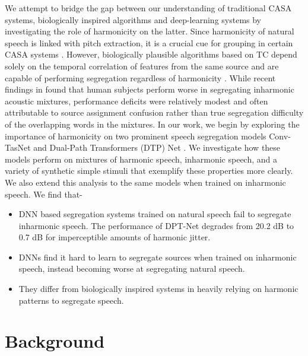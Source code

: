 \documentclass{article}
\begin{document}
We attempt to bridge the gap between our understanding of traditional CASA systems, biologically inspired algorithms and deep-learning systems by investigating the role of harmonicity on the latter. Since harmonicity of natural speech is linked with pitch extraction, it is a crucial cue for grouping in certain CASA systems \cite{vishnubhotla2009algorithm, wang1999separation}. However, biologically plausible algorithms based on TC depend solely on the temporal correlation of features from the same source and are capable of performing segregation regardless of harmonicity \cite{krishnan2014segregating}. While recent findings in \cite{popham2018inharmonic} found that human subjects perform worse in segregating inharmonic acoustic mixtures, performance deficits were relatively modest and often attributable to source assignment confusion rather than true segregation difficulty of the overlapping words in the mixtures. 
In our work, we begin by exploring the importance of harmonicity on two prominent speech segregation models Conv-TasNet \cite{luo2019conv} and Dual-Path Transformers (DTP) Net \cite{chen2020dual}. We investigate how these models perform on mixtures of harmonic speech, inharmonic speech, and a variety of synthetic simple stimuli that exemplify these properties more clearly. We also extend this analysis to the same models when trained on inharmonic speech. We find that- 
\begin{itemize}
    \item DNN based segregation systems trained on natural speech  fail to segregate inharmonic speech. The performance of DPT-Net degrades from 20.2 dB to 0.7 dB for imperceptible amounts of harmonic jitter.
    \item DNNs find it hard to learn to segregate sources when trained on inharmonic speech, instead becoming  worse at segregating natural speech.
    \item They differ from biologically inspired systems in heavily relying on harmonic patterns to segregate speech.
\end{itemize}




\section{Background}
\end{document}

